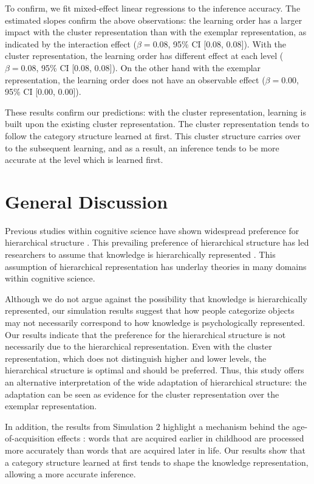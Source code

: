 \documentclass[doc]{apa6}
\begin{document}
To confirm, we fit mixed-effect linear regressions to the inference accuracy. The estimated slopes
confirm the above observations: the learning order has a larger impact with the cluster
representation than with the exemplar representation, as indicated by the interaction effect
($\beta=0.08$, 95\% CI [$0.08$, $0.08$]). With the cluster representation, the learning order has
different effect at each level ($\beta=0.08$, 95\% CI [$0.08$, $0.08$]). On the other hand with the
exemplar representation, the learning order does not have an observable effect ($\beta=0.00$, 95\%
CI [$0.00$, $0.00$]).

These results confirm our predictions: with the cluster representation, learning is built upon the
existing cluster representation. The cluster representation tends to follow the category structure
learned at first.  This cluster structure carries over to the subsequent learning, and as a result,
an inference tends to be more accurate at the level which is learned first.


\section*{General Discussion}

Previous studies within cognitive science have shown widespread preference for hierarchical
structure \parencite[e.g.,][]{Rosch1976a}. This prevailing preference of hierarchical structure has
led researchers to assume that knowledge is hierarchically represented
\parencite[e.g.,][]{Markman1984a, Markman1989a}.  This assumption of hierarchical representation has
underlay theories in many domains within cognitive science.

Although we do not argue against the possibility that knowledge is hierarchically represented, our
simulation results suggest that how people categorize objects may not necessarily correspond to how
knowledge is psychologically represented. Our results indicate that the preference for the
hierarchical structure is not necessarily due to the hierarchical representation. Even with the
cluster representation, which does not distinguish higher and lower levels, the hierarchical
structure is optimal and should be preferred. Thus, this study offers an alternative interpretation
of the wide adaptation of hierarchical structure: the adaptation can be seen as evidence for the
cluster representation over the exemplar representation.

In addition, the results from Simulation 2 highlight a mechanism behind the age-of-acquisition
effects \parencite{Gerhand1998a, Morrison1995a}: words that are acquired earlier in childhood are
processed more accurately than words that are acquired later in life. Our results show that a
category structure learned at first tends to shape the knowledge representation, allowing a more
accurate inference.
\end{document}
